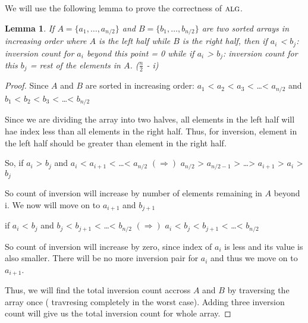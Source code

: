 \documentclass[11pt]{article}
\newcommand{\alg}{\textsc{alg}}
\newtheorem{lemma}[theorem]{Lemma}
\begin{document}
We will use the following lemma to prove the correctness of $\alg$.

\begin{lemma}\label{inversion-count-lemma}
If $A = \{a_1, \dots, a_{n/2}\}$ and $B = \{b_1, \dots, b_{n/2}\}$ are two sorted arrays in increasing order where 
$A$ is the left half while $B$ is the right half, then \newline
if $a_i$ < $b_j$: inversion count for $a_i$ beyond this point = 0 \newline
while if $a_i$ > $b_j$: inversion count for this $b_j$ = rest of the elements in $A$. ($\frac{n}{2}$ - i)
\end{lemma}

\begin{proof}
Since $A$ and $B$ are sorted in increasing order: \newline
$a_1$ < $a_2$ <  $a_3$ < \dots < $a_{n/2}$ \newline
and  $b_1$ < $b_2$ <  $b_3$ < \dots < $b_{n/2}$ \newline

Since we are dividing the array into two halves, all elements in the left half will hae index less than all elements in the right half.
Thus, for inversion, element in the left half should be greater than element in the right half. \newline

So, if $a_i$ > $b_j$ and $a_i$ < $a_{i+1}$ < \dots < $a_{n/2}$ \newline
  $(\Rightarrow)$ $a_{n/2}$ > $a_{n/2-1}$ > \dots > $a_{i+1}$ > $a_i$ > $b_j$ \newline

So count of inversion will increase by number of elements remaining in $A$ beyond i. We now will move on to $a_{i+1}$ 
and $b_{j+1}$

 if $a_i$ < $b_j$ and $b_j$ < $b_{j+1}$ < \dots < $b_{n/2}$  \newline
  $(\Rightarrow)$   $a_i$ < $b_j$ < $b_{j+1}$ < \dots < $b_{n/2}$ \newline

So count of inversion will increase by zero,  since index of $a_i$ is less and its value is also smaller. There will  be no more inversion
pair for $a_i$ and thus we move on to $a_{i+1}$.

Thus, we will find the total inversion count accross $A$ and $B$ by traversing the array once (
travresing completely in the worst case). \newline
Adding three inversion count will give us the total inversion count for whole array.
\end{proof}
\end{document}
